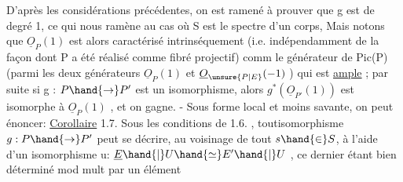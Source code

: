 D'après les considérations précédentes, on est ramené à prouver
que g est de degré 1, ce qui nous ramène au cas où S est le spectre d'un
corps, Mais notons que $\underline{O}_P(1)$ est alors caractérisé intrinséquement (i.e.
indépendamment de la façon dont P a été réalisé comme fibré projectif)
comm le générateur de Pic(P) (parmi les deux générateurs $\underline{O}_P(1)$ et
$\underline{O}_{\unsure{P|E}}(-1)$ ) qui est \uline{ample} ; par suite si g : $P\hand{\to} P'$ est un isomorphisme,
alors $g^{*}(\underline{O}_{P'}(1))$ est isomorphe à $\underline{O}_P(1)$ , et on gagne. - Sous forme local
et moins savante, on peut énoncer:
\uline{Corollaire} 1.7. Sous les conditions de 1.6. , toutisomorphisme $g:P\hand{\to} P'$
peut se décrire, au voisinage de tout $s\hand{\in} S$, à l'aide d'un isomorphisme
u: $\underline{E}\hand{|}U \hand{\simeq} E'\hand{|}U$ , ce dernier étant bien déterminé mod mult par un élément
